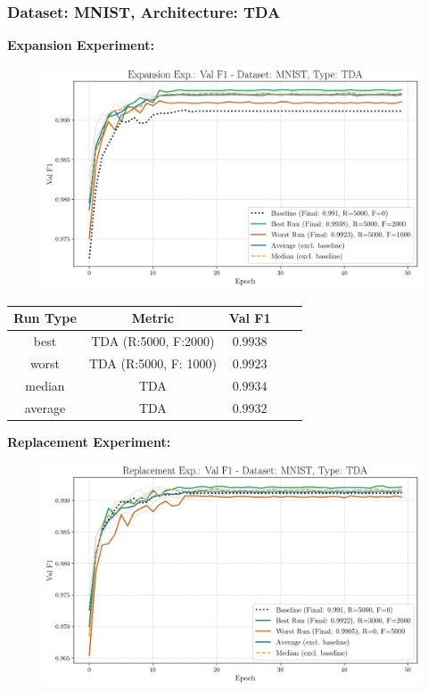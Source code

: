 \subsubsection{Dataset: MNIST, Architecture: TDA}
\noindent\textbf{Expansion Experiment:}
\begin{figure}[htbp]
	\centering
	\includegraphics[width=.85\textwidth]{abb/strat_classifier_performance/tda_mnist/expansion_experiments/val_f1_score_tda_mnist_mnist_all.png}
	\label{fig:app_strat_class_performance_expansion_exp._val_f1_score_}
\end{figure}
\begin{table}[H]
	\centering
	\vspace{-1em}
	\begin{tabular}{|c|c|c|c|c|}
		\hline
		Run Type & Metric & Val F1 \\ \hline
		best & TDA (R:5000, F:2000) & $0.9938$\\ \hline
		worst & TDA (R:5000, F: 1000) & $0.9923$\\ \hline
		median & TDA & $0.9934$\\ \hline
		average & TDA & $0.9932$
		\\ \hline
	\end{tabular}
\end{table}
\noindent\textbf{Replacement Experiment:}
\begin{figure}[htbp]
	\centering
	\includegraphics[width=.85\textwidth]{abb/strat_classifier_performance/tda_mnist/replacement_experiments/val_f1_score_tda_mnist_mnist_all.png}
	\label{fig:app_strat_class_performance_replacement_exp._val_f1_score_}
\end{figure}

